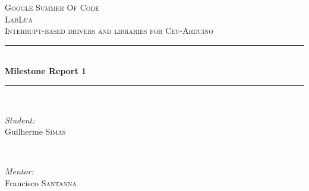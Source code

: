 \documentclass{article}
\begin{document}
\begin{titlepage}

\newcommand{\HRule}{\rule{\linewidth}{0.5mm}} %

\center %
 

\textsc{\LARGE Google Summer Of Code}\\[1.5cm] %
\textsc{\Large LabLua}\\[0.5cm] %
\textsc{\large Interrupt-based drivers and libraries for Ceu-Arduino}\\[0.5cm] %


\HRule \\[0.4cm]
{ \huge \bfseries Milestone Report 1}\\[0.4cm] %
\HRule \\[1.5cm]
 

\begin{minipage}{0.4\textwidth}
\begin{flushleft} \large
\emph{Student:}\\
Guilherme \textsc{Simas} %
\end{flushleft}
\end{minipage}
~
\begin{minipage}{0.4\textwidth}
\begin{flushright} \large
\emph{Mentor:} \\
Francisco \textsc{Santanna} %
\end{flushright}
\end{minipage}\\[4cm]



\end{titlepage}
\end{document}
